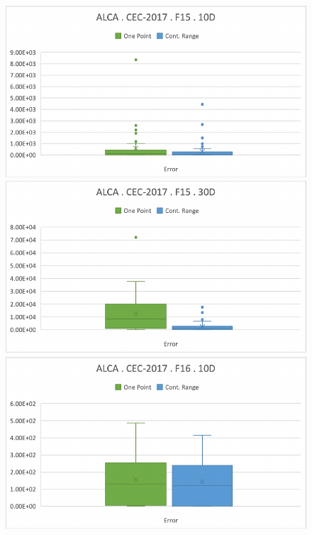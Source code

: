 \documentclass[graybox]{svmult}
\begin{document}
    \begin{figure}[!ht]
        \begin{minipage}[h]{0.49\linewidth}
            \includegraphics[width=1\linewidth]{img/fig_experiment_F15x10D.pdf} 
        \end{minipage}
        \hfill
        \vspace{0.05 cm}
        \begin{minipage}[h]{0.49\linewidth}
            \includegraphics[width=1\linewidth]{img/fig_experiment_F15x30D.pdf} 
        \end{minipage}
        \vfill
        \vspace{0.05 cm}
        \begin{minipage}[h]{0.49\linewidth}
            \includegraphics[width=1\linewidth]{img/fig_experiment_F16x10D.pdf} 

\end{minipage}
\end{figure}
\end{document}
